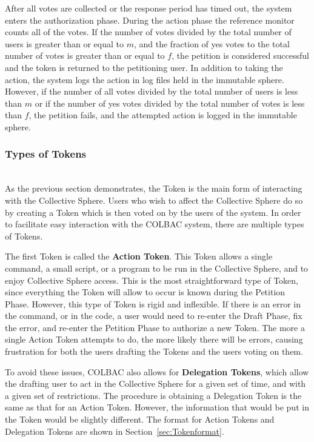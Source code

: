 After all votes are collected or the response period has timed out, the system
enters the authorization phase. During the action phase the reference monitor
counts all of the votes. If the number of votes divided by the total number of
users is greater than or equal to $m$, and the fraction of yes votes to the
total number of votes is greater than or equal to $f$, the petition is
considered successful and the token is returned to the petitioning user. In
addition to taking the action, the system logs the action in log files held in
the immutable sphere. However, if the number of all votes divided by the total
number of users is less than $m$ or if the number of yes votes divided by the
total number of votes is less than $f$, the petition fails, and the attempted
action is logged in the immutable sphere.

\subsubsection{Types of Tokens}
\label{sec:Tokentypes}
\mbox{}\\
As the previous section demonstrates, the Token is the main form of interacting
with the Collective Sphere. Users who wish to affect the Collective Sphere do
so by creating a Token which is then voted on by the users of the system. In
order to facilitate easy interaction with the COLBAC system, there are multiple
types of Tokens.

The first Token is called the \textbf{Action Token}. This Token allows a single
command, a small script, or a program to be run in the Collective Sphere, and to
enjoy Collective Sphere access. This is the most straightforward type of Token,
since everything the Token will allow to occur is known during the Petition
Phase. However, this type of Token is rigid and inflexible. If there is an error
in the command, or in the code, a user would need to re-enter the Draft Phase,
fix the error, and re-enter the Petition Phase to authorize a new Token. The
more a single Action Token attempts to do, the more likely there will be errors,
causing frustration for both the users drafting the Tokens and the users voting
on them.

To avoid these issues, COLBAC also allows for \textbf{Delegation Tokens}, which
allow the drafting user to act in the Collective Sphere for a given set of time,
and with a given set of restrictions. The procedure is obtaining a Delegation
Token is the same as that for an Action Token. However, the information that
would be put in the Token would be slightly different. The format for Action
Tokens and Delegation Tokens are shown in Section~\ref{sec:Tokenformat}.

